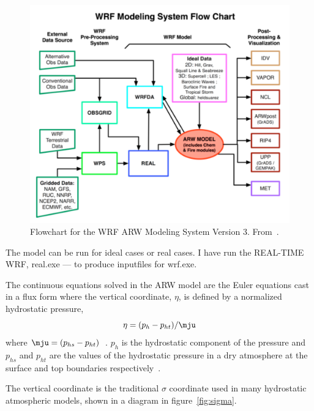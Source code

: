 \begin{figure}
\centering
\includegraphics[width=\textwidth]{model_methods/wrfflowchart}
\caption{Flowchart for the WRF ARW Modeling System Version 3. From~\cite{Wang2015}.}
\label{fig:wrfflowchart}
\end{figure}

The model can be run for ideal cases or real cases. I have run the REAL-TIME WRF, real.exe — to produce inputfiles for wrf.exe.

The continuous equations solved in the ARW model are the Euler equations cast in a flux form where the vertical coordinate, $\eta$, is defined by a normalized hydrostatic pressure,
\begin{equation}
\eta = (p_h - p_{ht})/\mju 
\end{equation}
where $\mju = (p_{hs} - p_{ht})$~\citep{Skamarock2008}. $p_h$ is the hydrostatic component of the pressure and $p_{hs}$ and $p_{ht}$ are the values of the hydrostatic pressure in a dry atmosphere at the surface and top boundaries respectively~\citep{Skamarock2008}.

The vertical coordinate is the traditional $\sigma$ coordinate used in many hydrostatic atmospheric models, shown in a diagram in figure~\ref{fig:sigma}.

